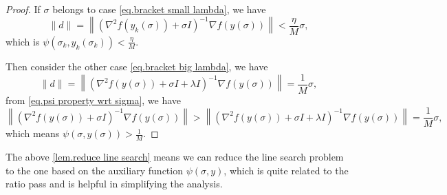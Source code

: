 \documentclass{article}
\begin{document}
\begin{proof}
If $\sigma$ belongs to case \eqref{eq.bracket small lambda}, we have 
\begin{equation*}
    \|d\| = \left \|\left(\nabla^2 f(y_k(\sigma))+\sigma I\right)^{-1}\nabla f(y(\sigma))\right\|<\frac{\eta}{M}\sigma,
\end{equation*}
which is $\psi(\sigma_k,y_k(\sigma_k))<\frac{\eta}{M}$.

Then consider the other case \eqref{eq.bracket big lambda}, we have
\begin{equation*}
    \|d\| = \left \|\left(\nabla^2 f(y(\sigma))+\sigma I+\lambda I\right)^{-1}\nabla f(y(\sigma))\right\|=\frac{1}{M}\sigma,
\end{equation*}
from \eqref{eq.psi property wrt sigma}, we have 
\begin{equation*}
     \left \|\left(\nabla^2 f(y(\sigma))+\sigma I\right)^{-1}\nabla f(y(\sigma))\right\|>\left \|\left(\nabla^2 f(y(\sigma))+\sigma I+\lambda I\right)^{-1}\nabla f(y(\sigma))\right\|=\frac{1}{M}\sigma,
\end{equation*}
which means $\psi \left(\sigma,y(\sigma)\right)>\frac{1}{M}$.
\end{proof}
The above \autoref{lem.reduce line search} means we can reduce the line search problem to the one based on the auxiliary function $\psi(\sigma,y)$, which is quite related to the ratio pass and is helpful in simplifying the analysis.
\end{document}
